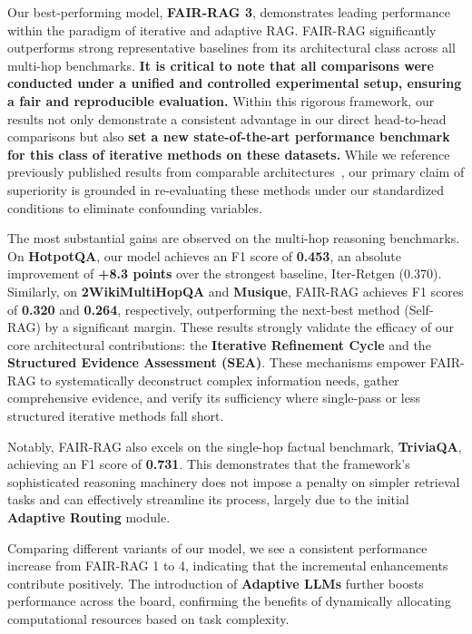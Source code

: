 \documentclass[11pt]{article}
\begin{document}
Our best-performing model, \textbf{FAIR-RAG 3}, demonstrates leading performance within the paradigm of iterative and adaptive RAG. FAIR-RAG significantly outperforms strong representative baselines from its architectural class across all multi-hop benchmarks. \textbf{It is critical to note that all comparisons were conducted under a unified and controlled experimental setup, ensuring a fair and reproducible evaluation.} Within this rigorous framework, our results not only demonstrate a consistent advantage in our direct head-to-head comparisons but also \textbf{set a new state-of-the-art performance benchmark for this class of iterative methods on these datasets.} While we reference previously published results from comparable architectures~\cite{shao2023iter,asai2023self,jeong2024adaptiveraglearningadaptretrievalaugmented}, our primary claim of superiority is grounded in re-evaluating these methods under our standardized conditions to eliminate confounding variables. 

The most substantial gains are observed on the multi-hop reasoning benchmarks. On \textbf{HotpotQA}, our model achieves an F1 score of \textbf{0.453}, an absolute improvement of \textbf{+8.3 points} over the strongest baseline, Iter-Retgen (0.370). Similarly, on \textbf{2WikiMultiHopQA} and \textbf{Musique}, FAIR-RAG achieves F1 scores of \textbf{0.320} and \textbf{0.264}, respectively, outperforming the next-best method (Self-RAG) by a significant margin. These results strongly validate the efficacy of our core architectural contributions: the \textbf{Iterative Refinement Cycle} and the \textbf{Structured Evidence Assessment (SEA)}. These mechanisms empower FAIR-RAG to systematically deconstruct complex information needs, gather comprehensive evidence, and verify its sufficiency where single-pass or less structured iterative methods fall short.

Notably, FAIR-RAG also excels on the single-hop factual benchmark, \textbf{TriviaQA}, achieving an F1 score of \textbf{0.731}. This demonstrates that the framework's sophisticated reasoning machinery does not impose a penalty on simpler retrieval tasks and can effectively streamline its process, largely due to the initial \textbf{Adaptive Routing} module.

Comparing different variants of our model, we see a consistent performance increase from FAIR-RAG 1 to 4, indicating that the incremental enhancements contribute positively. The introduction of \textbf{Adaptive LLMs} further boosts performance across the board, confirming the benefits of dynamically allocating computational resources based on task complexity.
\end{document}

